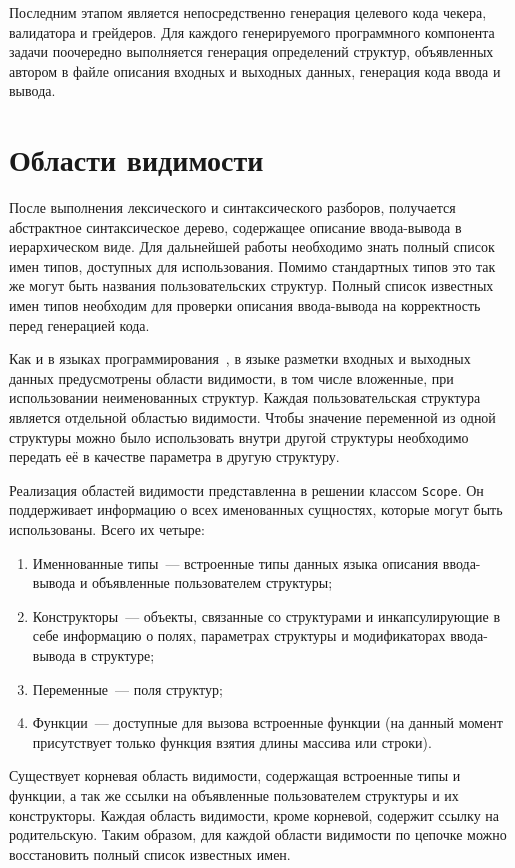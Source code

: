 \documentclass[times,specification,annotation]{style/itmo-student-thesis/itmo-student-thesis}
\begin{document}
Последним этапом является непосредственно генерация целевого кода чекера, валидатора и грейдеров. Для каждого генерируемого программного компонента задачи поочередно выполняется генерация определений структур, объявленных автором в файле описания входных и выходных данных, генерация кода ввода и вывода.

\section{Области видимости}

После выполнения лексического и синтаксического разборов, получается абстрактное синтаксическое дерево, содержащее описание ввода-вывода в иерархическом виде. Для дальнейшей работы необходимо знать полный список имен типов, доступных для использования. Помимо стандартных типов это так же могут быть названия пользовательских структур. Полный список известных имен типов необходим для проверки описания ввода-вывода на корректность перед генерацией кода.

Как и в языках программирования~\cite{aho-compilers}, в языке разметки входных и выходных данных предусмотрены области видимости, в том числе вложенные, при использовании неименованных структур. Каждая пользовательская структура является отдельной областью видимости. Чтобы значение переменной из одной структуры можно было использовать внутри другой структуры необходимо передать её в качестве параметра в другую структуру.

Реализация областей видимости представленна в решении классом \texttt{Scope}. Он поддерживает информацию о всех именованных сущностях, которые могут быть использованы. Всего их четыре:

\begin{enumerate}
    \item Именнованные типы~--- встроенные типы данных языка описания ввода-вывода и объявленные пользователем структуры;
    \item Конструкторы~--- объекты, связанные со структурами и инкапсулирующие в себе информацию о полях, параметрах структуры и модификаторах ввода-вывода в структуре;
    \item Переменные~--- поля структур;
    \item Функции~--- доступные для вызова встроенные функции (на данный момент присутствует только функция взятия длины массива или строки).
\end{enumerate}

Существует корневая область видимости, содержащая встроенные типы и функции, а так же ссылки на объявленные пользователем структуры и их конструкторы. Каждая область видимости, кроме корневой, содержит ссылку на родительскую. Таким образом, для каждой области видимости по цепочке можно восстановить полный список известных имен.
\end{document}

